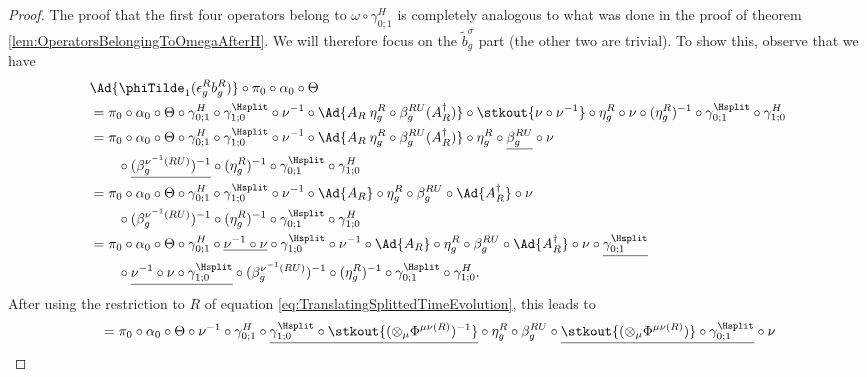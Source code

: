 \begin{proof}
	The proof that the first four operators belong to $\omega\circ\gamma^H_{0;1}$ is completely analogous to what was done in the proof of theorem \ref{lem:OperatorsBelongingToOmegaAfterH}. We will therefore focus on the $\tilde{b}_g^\sigma$ part (the other two are trivial). To show this, observe that we have
	\begin{align}
		&\Ad{\phiTilde_1(\epsilon_g^R b_g^R)}\circ\pi_0\circ\alpha_0\circ\Theta\\
		&=\pi_0\circ\alpha_0\circ\Theta\circ\gamma^H_{0;1}\circ\gamma^{\Hsplit}_{1;0}\circ\nu^{-1}\circ\Ad{A_R\: \eta_g^R\circ\beta_g^{RU}(A_R^\dagger)}\circ\stkout{\nu\circ\nu^{-1}}\circ\eta_g^R\circ\nu\circ(\eta_g^R)^{-1}\circ\gamma^{\Hsplit}_{0;1}\circ\gamma^{H}_{1;0}\\
		&=\pi_0\circ\alpha_0\circ\Theta\circ\gamma^H_{0;1}\circ\gamma^{\Hsplit}_{1;0}\circ\nu^{-1}\circ\Ad{A_R\: \eta_g^R\circ\beta_g^{RU}(A_R^\dagger)}\circ\eta_g^R\circ\underline{\beta_g^{RU}}\circ\nu\\
		\nonumber
		&\qquad\circ\underline{(\beta_g^{\nu^{-1}(RU)})^{-1}}\circ(\eta_g^R)^{-1}\circ\gamma^{\Hsplit}_{0;1}\circ\gamma^{H}_{1;0}\\
		&=\pi_0\circ\alpha_0\circ\Theta\circ\gamma^H_{0;1}\circ\gamma^{\Hsplit}_{1;0}\circ\nu^{-1}\circ\Ad{A_R}\circ\eta_g^R\circ\beta_g^{RU}\circ\Ad{A_R^\dagger}\circ\nu\\
		\nonumber
		&\qquad\circ(\beta_g^{\nu^{-1}(RU)})^{-1}\circ(\eta_g^R)^{-1}\circ\gamma^{\Hsplit}_{0;1}\circ\gamma^{H}_{1;0}\\
		&=\pi_0\circ\alpha_0\circ\Theta\circ\gamma^H_{0;1}\circ\underline{\nu^{-1}\circ\nu}\circ\gamma^{\Hsplit}_{1;0}\circ\nu^{-1}\circ\Ad{A_R}\circ\eta_g^R\circ\beta_g^{RU}\circ\Ad{A_R^\dagger}\circ\nu\circ\underline{\gamma^{\Hsplit}_{0;1}}\\
		\nonumber
		&\qquad \circ\underline{\nu^{-1}\circ\nu\circ\gamma^{\Hsplit}_{1;0}}\circ(\beta_g^{\nu^{-1}(RU)})^{-1}\circ(\eta_g^R)^{-1}\circ\gamma^{\Hsplit}_{0;1}\circ\gamma^{H}_{1;0}.
	\end{align}
	After using the restriction to $R$ of equation \eqref{eq:TranslatingSplittedTimeEvolution}, this leads to
	\begin{align}
		&=\pi_0\circ\alpha_0\circ\Theta\circ\nu^{-1}\circ\gamma^H_{0;1}\circ\underline{\gamma^{\Hsplit}_{1;0}\circ\stkout{(\otimes_\mu\Phi^{\mu\nu(R)})^{-1}}}\circ\eta_g^R\circ\beta_g^{RU}\circ\underline{\stkout{(\otimes_\mu\Phi^{\mu\nu(R)})}\circ\gamma^{\Hsplit}_{0;1}}\circ\nu\\

\end{align}
\end{proof}
